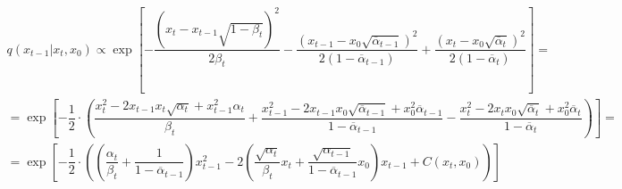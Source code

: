 \documentclass[11pt, a4paper, twocolumn, twoside]{article} %
\begin{document}
\begin{table}[h!]
\begin{multline}
	q(x_{t-1}| x_t, x_0) \propto\exp\left[-\dfrac{(x_t-x_{t-1}\sqrt{1-\beta_t})^2}{2\beta_t} - \dfrac{(x_{t-1}-x_0\sqrt{\overline\alpha_{t-1}})^2}{2(1-\overline\alpha_{t-1})} + \dfrac{(x_t-x_0\sqrt{\overline\alpha_t})^2}{2(1-\overline\alpha_t)}\right] = \\ 
	= \exp\left[-\dfrac{1}{2}\cdot\left(\dfrac{x_t^2-2x_{t-1}x_t\sqrt{\alpha_t} +x^2_{t-1}\alpha_t}{\beta_t} + \dfrac{x_{t-1}^2-2x_{t-1}x_0\sqrt{\overline\alpha_{t-1}}+x_0^2\overline\alpha_{t-1}}{1-\overline\alpha_{t-1}} - \dfrac{x_t^2-2x_tx_0\sqrt{\overline\alpha_t}+x_0^2\overline\alpha_t}{1-\overline\alpha_t}\right)\right] = \\
	= \exp\left[-\dfrac{1}{2}\cdot\left(\left(\dfrac{\alpha_t}{\beta_t} + \dfrac{1}{1-\overline\alpha_{t-1}}\right)x^2_{t-1} - 2\left(\dfrac{\sqrt{\alpha_t}}{\beta_t}x_t+ \dfrac{\sqrt{\alpha_{t-1}}}{1-\overline\alpha_{t-1}}x_0\right)x_{t-1}+C(x_t,x_0)\right)\right]
\end{multline}
\end{table}
\end{document}
